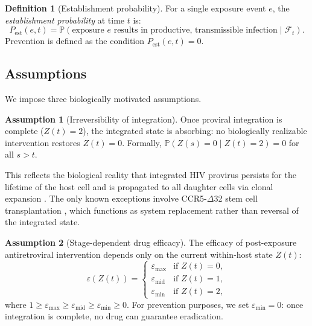 \documentclass[12pt,a4paper]{article}
\theoremstyle{plain}
\theoremstyle{definition}
\newtheorem{definition}[theorem]{Definition}
\newtheorem{assumption}{Assumption}
\theoremstyle{remark}
\newcommand{\Pest}{P_{\mathrm{est}}}
\newcommand{\Prob}{\mathbb{P}}
\begin{document}
\begin{definition}[Establishment probability]\label{def:Pest}
For a single exposure event $e$, the \emph{establishment probability} at time $t$ is:
\begin{equation}\label{eq:Pest}
    \Pest(e,t) = \Prob(\text{exposure } e \text{ results in productive, transmissible infection} \mid \mathcal{F}_t).
\end{equation}
Prevention is defined as the condition $\Pest(e,t) = 0$.
\end{definition}




\subsection{Assumptions}\label{sec:assumptions}

We impose three biologically motivated assumptions.

\begin{assumption}[Irreversibility of integration]\label{A1}
Once proviral integration is complete ($Z(t) = 2$), the integrated state is absorbing: no biologically realizable intervention restores $Z(t) = 0$. Formally, $\Prob(Z(s) = 0 \mid Z(t) = 2) = 0$ for all $s > t$.
\end{assumption}

This reflects the biological reality that integrated HIV provirus persists for the lifetime of the host cell and is propagated to all daughter cells via clonal expansion \citep{ref:Wahl2023,ref:Siliciano2015}. The only known exceptions involve CCR5-$\Delta$32 stem cell transplantation \citep{ref:Hutter2009}, which functions as system replacement rather than reversal of the integrated state.

\begin{assumption}[Stage-dependent drug efficacy]\label{A2}
The efficacy of post-exposure antiretroviral intervention depends only on the current within-host state $Z(t)$:
\begin{equation}\label{eq:stage-eff}
    \varepsilon(Z(t)) = \begin{cases}
        \varepsilon_{\max} & \text{if } Z(t) = 0, \\
        \varepsilon_{\mathrm{mid}} & \text{if } Z(t) = 1, \\
        \varepsilon_{\min} & \text{if } Z(t) = 2,
    \end{cases}
\end{equation}
where $1 \geq \varepsilon_{\max} \geq \varepsilon_{\mathrm{mid}} \geq \varepsilon_{\min} \geq 0$. For prevention purposes, we set $\varepsilon_{\min} = 0$: once integration is complete, no drug can guarantee eradication.
\end{assumption}
\end{document}
